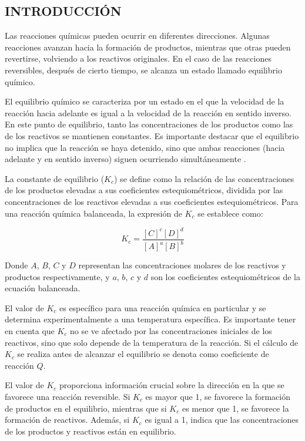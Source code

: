 \documentclass[10pt]{article}
\begin{document}
\begin{multicols*}{2}
    \section{\small INTRODUCCIÓN}
    Las reacciones químicas pueden ocurrir en diferentes direcciones. Algunas reacciones avanzan hacia la formación de productos, mientras que otras pueden revertirse, volviendo a los reactivos originales. En el caso de las reacciones reversibles, después de cierto tiempo, se alcanza un estado llamado equilibrio químico.

    El equilibrio químico se caracteriza por un estado en el que la velocidad de la reacción hacia adelante es igual a la velocidad de la reacción en sentido inverso. En este punto de equilibrio, tanto las concentraciones de los productos como las de los reactivos se mantienen constantes. Es importante destacar que el equilibrio no implica que la reacción se haya detenido, sino que ambas reacciones (hacia adelante y en sentido inverso) siguen ocurriendo simultáneamente \cite{giancoli}.

    La constante de equilibrio ($K_c$) se define como la relación de las concentraciones de los productos elevadas a sus coeficientes estequiométricos, dividida por las concentraciones de los reactivos elevadas a sus coeficientes estequiométricos. Para una reacción química balanceada, la expresión de $K_c$ se establece como:

    \begin{equation}
        K_c = \frac{[C]^c[D]^d}{[A]^a[B]^b}
        \label{eq:kc}
    \end{equation}

    Donde $A$, $B$, $C$ y $D$ representan las concentraciones molares de los reactivos y productos respectivamente, y $a$, $b$, $c$ y $d$ son los coeficientes estequiométricos de la ecuación balanceada.

    El valor de $K_c$ es específico para una reacción química en particular y se determina experimentalmente a una temperatura específica. Es importante tener en cuenta que $K_c$ no se ve afectado por las concentraciones iniciales de los reactivos, sino que solo depende de la temperatura de la reacción. Si el cálculo de $K_c$ se realiza antes de alcanzar el equilibrio se denota como coeficiente de reacción $Q$.

    El valor de $K_c$ proporciona información crucial sobre la dirección en la que se favorece una reacción reversible. Si $K_c$ es mayor que 1, se favorece la formación de productos en el equilibrio, mientras que si $K_c$ es menor que 1, se favorece la formación de reactivos. Además, si $K_c$ es igual a 1, indica que las concentraciones de los productos y reactivos están en equilibrio.


\end{multicols*}
\end{document}

